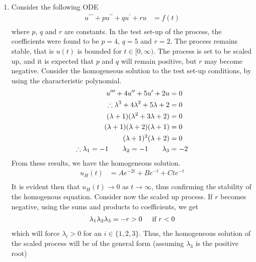 \documentclass[a4paper]{article}
\newcommand{\ds}{\displaystyle}
\begin{document}
\begin{enumerate}
	\item Consider the following ODE
	\begin{align*}
		u^{\prime\prime\prime} + pu^{\prime\prime} + qu^{\prime} + ru & = f(t)\\
	\end{align*}
	where $\ds{p}$, $\ds{q}$ and $\ds{r}$ are constants. In the test set-up of the process, the coefficients were found to be $\ds{p=4}$, $\ds{q=5}$ and $\ds{r=2}$. The process remains stable, that is $\ds{u(t)}$ is bounded for $\ds{t\in [0, \infty)}$. The process is set to be scaled up, and it is expected that $\ds{p}$ and $\ds{q}$ will remain positive, but $\ds{r}$ may become negative. Consider the homogeneous solution to the test set-up conditions, by using the characteristic polynomial.
	\begin{align*}
		u^{\prime\prime\prime} + 4u^{\prime\prime} + 5u^{\prime} + 2u & = 0\\
		\therefore \lambda^3 + 4\lambda^2 + 5\lambda + 2 & = 0\\
		(\lambda + 1)(\lambda^2 + 3\lambda + 2) & = 0\\
		(\lambda + 1)(\lambda + 2)(\lambda + 1) & = 0\\
		(\lambda + 1)^2(\lambda + 2) & = 0\\
		\therefore \lambda_1 = -1 \hspace{7mm} \lambda_2 = -1 \hspace{7mm} \lambda_3 & = -2\\
	\end{align*}
	From these results, we have the homogeneous solution.
	\begin{align*}
		u_H(t) & = Ae^{-2t} + Be^{-t} + Cte^{-t}\\
	\end{align*}
	It is evident then that $\ds{u_H(t) \rightarrow 0}$ as $\ds{t \rightarrow \infty}$, thus confirming the stability of the homogenous equation. Consider now the scaled up process. If $\ds{r}$ becomes negative, using the sums and products to coefficients, we get
	\begin{align*}
		\lambda_1\lambda_2\lambda_3 & = -r > 0 \hspace{5mm} \text{if } r < 0\\
	\end{align*}
	which will force $\ds{\lambda_i > 0}$ for an $\ds{i \in \{1,2,3\}}$. Thus, the homogeneous solution of the scaled process will be of the general form (assuming $\ds{\lambda_3}$ is the positive root)
	\begin{align*}

\end{align*}
\end{enumerate}
\end{document}
